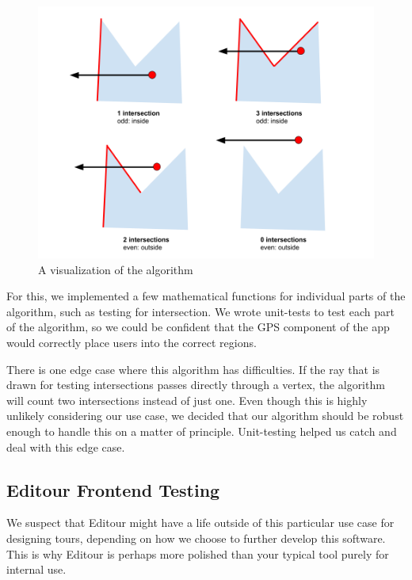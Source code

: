 \documentclass[a4paper, 10pt, american, titlepage]{article}
\begin{document}
\begin{figure}[h]
	\centering
	\includegraphics[width=\textwidth]{intersections-diagram.png}
	\caption{A visualization of the algorithm}
	\label{fig:intersectionsDiagram}
\end{figure}

For this, we implemented a few mathematical functions for individual parts of
the algorithm, such as testing for intersection. We wrote unit-tests to test
each part of the algorithm, so we could be confident that the GPS component of
the app would correctly place users into the correct regions.

There is one edge case where this algorithm has difficulties. If the ray that
is drawn for testing intersections passes directly through a vertex, the
algorithm will count two intersections instead of just one. Even though this is
highly unlikely considering our use case, we decided that our algorithm should
be robust enough to handle this on a matter of principle. Unit-testing helped us
catch and deal with this edge case.

\subsection{Editour Frontend Testing}
\label{sec:editourFrontendTesting}

We suspect that Editour might have a life outside of this particular use case
for designing tours, depending on how we choose to further develop this
software. This is why Editour is perhaps more polished than your typical tool
purely for internal use.
\end{document}
